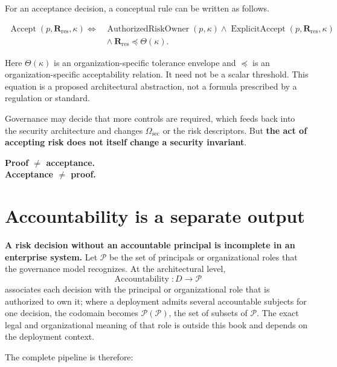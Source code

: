 \documentclass[10pt,oneside,openany]{book}
\begin{document}
For an acceptance decision, a conceptual rule can be written as follows.
\begin{formulabox}
\[
\begin{aligned}
\operatorname{Accept}(p,\mathbf{R}_{\mathrm{res}},\kappa)\iff{}&
\operatorname{AuthorizedRiskOwner}(p,\kappa)\land\operatorname{ExplicitAccept}(p,\mathbf{R}_{\mathrm{res}},\kappa)\\
&{}\land\mathbf{R}_{\mathrm{res}}\preceq\Theta(\kappa).
\end{aligned}
\]
\end{formulabox}
Here $\Theta(\kappa)$ is an organization-specific tolerance envelope and $\preceq$ is an organization-specific acceptability relation. It need not be a scalar threshold. This equation is a proposed architectural abstraction, not a formula prescribed by a regulation or standard.

Governance may decide that more controls are required, which feeds back into the security architecture and changes $\Omega_{\mathrm{sec}}$ or the risk descriptors. But \textbf{the act of accepting risk does not itself change a security invariant}.

\begin{center}
\sffamily\bfseries
Proof $\neq$ acceptance.\\
Acceptance $\neq$ proof.
\end{center}

\section{Accountability is a separate output}

\textbf{A risk decision without an accountable principal is incomplete in an enterprise system.} Let $\mathcal{P}$ be the set of principals or organizational roles that the governance model recognizes. At the architectural level,
\[
\operatorname{Accountability}:D\rightarrow \mathcal{P}
\]
associates each decision with the principal or organizational role that is authorized to own it; where a deployment admits several accountable subjects for one decision, the codomain becomes $\mathcal{P}(\mathcal{P})$, the set of subsets of $\mathcal{P}$. The exact legal and organizational meaning of that role is outside this book and depends on the deployment context.

The complete pipeline is therefore:
\end{document}
